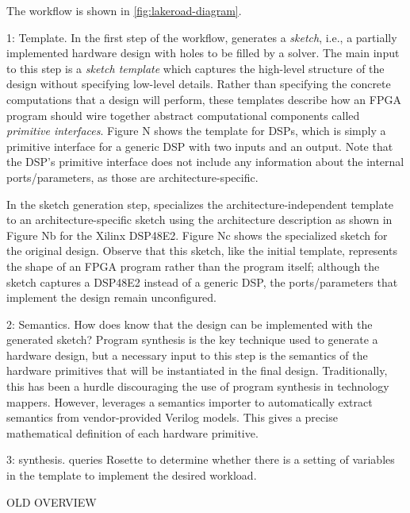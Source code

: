 The \lr workflow is shown in \cref{fig:lakeroad-diagram}.


1: Template. 
In the first step of the workflow,
   \lr generates a \textit{sketch}, i.e.,
   a partially implemented hardware design
   with holes to be filled by a solver.
   The main input to this step is a
   \textit{sketch template} which
   captures the high-level structure
   of the design without specifying
   low-level details. Rather than
   specifying the concrete computations that a
   design will perform, these templates
   describe how an FPGA program should wire
   together abstract computational components called
   \textit{primitive interfaces}.
   Figure N shows the template
   for DSPs, which is simply a primitive
   interface for a generic DSP with two
   inputs and an output. Note that the DSP's
   primitive interface does not include
   any information about the internal
   ports/parameters, as those are
   architecture-specific.
   
In the sketch generation step, 
  \lr specializes the architecture-independent
  template to an architecture-specific sketch
  using the architecture description
  as shown in Figure Nb for
  the Xilinx DSP48E2. Figure Nc
  shows the specialized sketch for the
  original design. Observe that this sketch,
  like the initial template,
  represents the shape of an FPGA
  program rather than the program itself;
  although the sketch captures a DSP48E2 instead
  of a generic DSP, the ports/parameters that
  implement the design remain unconfigured.

2: Semantics. 
How does \lr know that the design
  can be implemented with the
  generated sketch?
  Program synthesis is the key technique
  used to generate a hardware design, but a
  necessary input to this step is the semantics
  of the hardware primitives that will be
  instantiated in the final design.
  Traditionally, this has been a hurdle
  discouraging the use of program synthesis
  in technology mappers. However,
  \lr leverages a semantics importer
  to automatically extract semantics from
  vendor-provided Verilog models. This
  gives a precise mathematical definition
  of each hardware primitive.
  

3: synthesis.
\lr queries Rosette to determine
  whether there is a setting of variables
  in the template
  to implement the desired workload.

{\Large OLD OVERVIEW}

